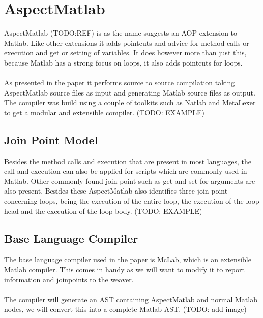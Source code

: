 \documentclass[a4paper]{report}
\begin{document}
\chapter{AspectMatlab}
AspectMatlab (TODO:REF) is as the name suggests an AOP extension to Matlab. Like other extensions it adds pointcuts and advice for method calls or execution and get or setting of variables. It does however more than just this, because Matlab has a strong focus on loops, it also adds pointcuts for loops.\\
\\
As presented in the paper it performs source to source compilation taking AspectMatlab source files as input and generating Matlab source files as output. The compiler was build using a couple of toolkits such as Natlab and MetaLexer to get a modular and extensible compiler. (TODO: EXAMPLE)

\section{Join Point Model}
Besides the method calls and execution that are present in most languages, the call and execution can also be applied for scripts which are commonly used in Matlab. Other commonly found join point such as get and set for arguments are also present. Besides these AspectMatlab also identifies three join point concerning loops, being the execution of the entire loop, the execution of the loop head and the execution of the loop body. (TODO: EXAMPLE)

\section{Base Language Compiler}
The base language compiler used in the paper is McLab, which is an extensible Matlab compiler. This comes in handy as we will want to modify it to report information and joinpoints to the weaver.\\
\\
The compiler will generate an AST containing AspectMatlab and normal Matlab nodes, we will convert this into a complete Matlab AST. (TODO: add image)
\end{document}
